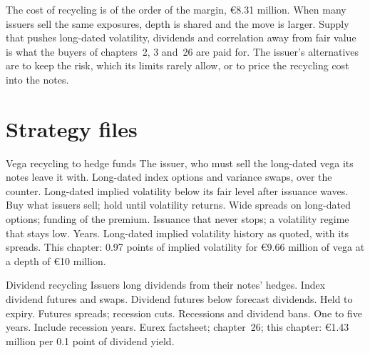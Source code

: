 The cost of recycling is of the order of the margin, \euro8.31 million. When many issuers sell the same exposures, depth is shared and the move is
larger. Supply that pushes long-dated volatility, dividends and correlation away from fair value is what the buyers of chapters~2, 3 and~26 are paid
for. The issuer's alternatives are to keep the risk, which its limits rarely allow, or to price the recycling cost into the notes.

\section{Strategy files}

\begin{strategyfile}{Vega recycling to hedge funds}\label{strat:s2:hedging-a-structured-products-book:vega}
 The issuer, who must sell the long-dated vega its notes leave it with.
 Long-dated index options and variance swaps, over the counter.
 Long-dated implied volatility below its fair level after issuance waves.
 Buy what issuers sell; hold until volatility returns.
 Wide spreads on long-dated options; funding of the premium.
 Issuance that never stops; a volatility regime that stays low.
 Years.
 Long-dated implied volatility history as quoted, with its spreads.
 This chapter: 0.97 points of implied volatility for \euro9.66 million of vega at a depth of \euro10 million.
\end{strategyfile}

\begin{strategyfile}{Dividend recycling}\label{strat:s2:hedging-a-structured-products-book:dividends}
 Issuers long dividends from their notes' hedges.
 Index dividend futures and swaps.
 Dividend futures below forecast dividends.
 Held to expiry.
 Futures spreads; recession cuts.
 Recessions and dividend bans.
 One to five years.
 Include recession years.
 Eurex factsheet; chapter~26; this chapter: \euro1.43 million per 0.1 point of dividend yield.
\end{strategyfile}

